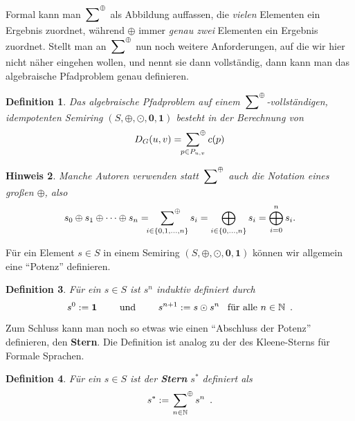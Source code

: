 \documentclass[ngerman, a4paper, 12pt]{article}
\newcommand{\satzende}{\enskip \text{.}}
\theoremstyle{mystyle}
\newtheorem{definition}{Definition}[section]
\newtheorem{hinweis}[definition]{Hinweis}
\begin{document}
	Formal kann man $\sideset{}{^\oplus}\sum$ als Abbildung auffassen, die \textit{vielen} Elementen ein Ergebnis zuordnet, während $\oplus$ immer \textit{genau zwei} Elementen ein Ergebnis zuordnet. Stellt man an $\sideset{}{^\oplus}\sum$ nun noch weitere Anforderungen, auf die wir hier nicht näher eingehen wollen, und nennt sie dann vollständig, dann kann man das algebraische Pfadproblem genau definieren.
	
	\begin{definition}
		Das algebraische Pfadproblem auf einem $\sideset{}{^\oplus}\sum$-vollständigen, idempotenten Semiring $(S, \oplus, \odot, \mathbf{0}, \mathbf{1})$ besteht in der Berechnung von 
		\begin{equation*}
			D_G(u,v) = \sideset{}{^\oplus}\sum_{p \in P_{u,v}} c(p)
		\end{equation*}
	\end{definition}

	\begin{hinweis}
		Manche Autoren verwenden statt $\sideset{}{^\oplus}\sum$ auch die Notation eines großen $\oplus$, also
		\begin{equation*}
			s_0 \oplus s_1 \oplus \dots  \oplus s_n = \sideset{}{^\oplus}\sum_{i \in \left\{ 0, 1, \dots, n \right\}} s_i = \bigoplus_{i \in \left\{ 0, \dots, n \right\}} s_i = \bigoplus_{i=0}^n s_i.
		\end{equation*}
	\end{hinweis}


	Für ein Element $s \in S$ in einem Semiring $(S, \oplus, \odot, \mathbf{0}, \mathbf{1})$ können wir allgemein eine \enquote{Potenz} definieren. 
	
	\begin{definition} \label{def: potenz}
		Für ein $s \in S$ ist $s^n$ induktiv definiert durch 
		\begin{equation*}
			s^0 \defeq \mathbf{1} \qquad \text{ und } \qquad s^{n+1} \defeq s \odot s^n \enskip \text{ für alle } n \in \N
			\satzende
		\end{equation*} 
	\end{definition}
	
	Zum Schluss kann man noch so etwas wie einen \enquote{Abschluss der Potenz} definieren, den \textbf{Stern}. Die Definition ist analog zu der des Kleene-Sterns für Formale Sprachen. 
	
	\begin{definition} \label{def: stern}
		Für ein $s \in S$ ist der \textbf{Stern} $s^\ast$ definiert als
		\begin{equation*}
			s^\ast \defeq \sideset{}{^\oplus}\sum_{n \in \N} s^n
			\satzende
		\end{equation*}
	\end{definition}
	
\end{document}
